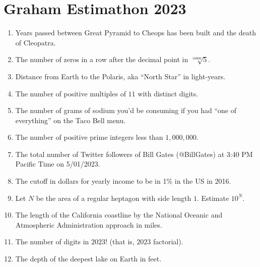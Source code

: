 \documentclass[12pt]{article}
\begin{document}
    \section*{Graham Estimathon 2023}
    \begin{enumerate}
        \item Years passed between Great Pyramid to Cheops has been built and the death of Cleopatra.
        \item The number of zeros in a row after the decimal point in $\sqrt[10000]{5}$.
        \item Distance from Earth to the Polaris, aka “North Star” in light-years.
        \item The number of positive multiples of $11$ with distinct digits.
        \item The number of grams of sodium you’d be consuming if you had “one of everything” on the Taco Bell menu.
        \item The number of positive prime integers less than $1{,}000{,}000$.
        \item The total number of Twitter followers of Bill Gates (@BillGates) at 3:40 PM Pacific Time on 5/01/2023.
        \item The cutoff in dollars for yearly income to be in 1\% in the US in 2016.
        \item Let $N$ be the area of a regular heptagon with side length $1$. Estimate $10^N$.
        \item The length of the California coastline by the National Oceanic and Atmospheric Administration approach in miles.
        \item The number of digits in $2023!$ (that is, $2023$ factorial).
        \item The depth of the deepest lake on Earth in feet.
    \end{enumerate}
\end{document}
